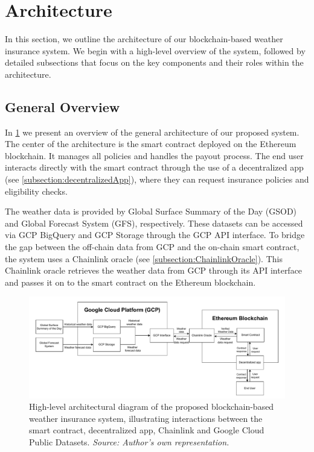\section{Architecture}
In this section, we outline the architecture of our blockchain-based weather insurance system. We begin with a high-level overview of the system, followed by detailed subsections that focus on the key components and their roles within the architecture.

\subsection{General Overview}\label{subsection:generalOverview}
In \cref{fig:generalArchitecture} we present an overview of the general architecture of our proposed system. The center of the architecture is the smart contract deployed on the Ethereum blockchain. It manages all policies and handles the payout process. The end user interacts directly with the smart contract through the use of a decentralized app (see \cref{subsection:decentralizedApp}), where they can request insurance policies and eligibility checks.

The weather data is provided by Global Surface Summary of the Day (GSOD) and Global Forecast System (GFS), respectively. These datasets can be accessed via GCP BigQuery and GCP Storage through the GCP API interface. To bridge the gap between the off-chain data from GCP and the on-chain smart contract, the system uses a Chainlink oracle (see \cref{subsection:ChainlinkOracle}). This Chainlink oracle retrieves the weather data from GCP through its API interface and passes it on to the smart contract on the Ethereum blockchain.

\begin{figure}[ht]
    \centering
    \includegraphics[width=1\textwidth]{figures/architecture-overview.drawio.pdf}
    \caption{High-level architectural diagram of the proposed blockchain-based weather insurance system, illustrating interactions between the smart contract, decentralized app, Chainlink and Google Cloud Public Datasets. \textit{Source: Author's own representation.}}
    \label{fig:generalArchitecture}
\end{figure}

